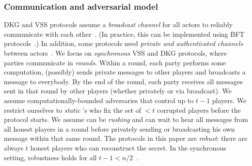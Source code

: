 \subsubsection{Communication and adversarial model}
DKG and VSS protocols assume a \textit{broadcast channel} for all actors to reliably communicate with each other~\cite{CGMA85,Pedersen1991AThreshold}.
(In practice, this can be implemented using BFT protocols~\cite{SJSW19}.)
In addition, some protocols need \textit{private and authenticated channels} between actors~\cite{Feldman1987Practical,Pedersen1991AThreshold,polycommit,dkg,Kate2010Distributed}.
We focus on \textit{synchronous} VSS and DKG protocols, where parties communicate in \textit{rounds}.
Within a round, each party performs some computation, (possibly) sends private messages to other players and broadcasts a message to everybody.
By the end of the round, each party receives all messages sent in that round by other players (whether privately or via broadcast).
We assume computationally-bounded adversaries \Adv that control up to $t-1$ players.
We restrict ourselves to \textit{static} \Adv's who fix the set of $<t$ corrupted players before the protocol starts.
We assume \Adv can be \textit{rushing} and can wait to hear all messages from all honest players in a round before privately sending or broadcasting his own message within that same round.
The protocols in this paper are \textit{robust}: there are always $t$ honest players who can reconstruct the secret.
In the synchronous setting, robustness holds for all $t - 1 < n/2$~\cite{dkg}.

